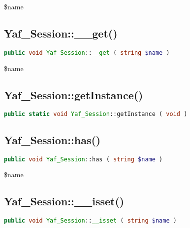 \begin{compactitem}
\item \$name
\end{compactitem}


\subsection{Yaf\_Session::\_\_get()}


\begin{lstlisting}[language=PHP]
public void Yaf_Session::__get ( string $name )
\end{lstlisting}

\begin{compactitem}
\item \$name
\end{compactitem}

\subsection{Yaf\_Session::getInstance()}


\begin{lstlisting}[language=PHP]
public static void Yaf_Session::getInstance ( void )
\end{lstlisting}

\subsection{Yaf\_Session::has()}



\begin{lstlisting}[language=PHP]
public void Yaf_Session::has ( string $name )
\end{lstlisting}

\begin{compactitem}
\item \$name
\end{compactitem}



\subsection{Yaf\_Session::\_\_isset()}



\begin{lstlisting}[language=PHP]
public void Yaf_Session::__isset ( string $name )
\end{lstlisting}

